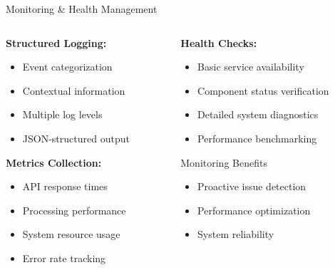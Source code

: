 \documentclass[aspectratio=169]{beamer}
\begin{document}
\begin{frame}{Monitoring \& Health Management}
    \begin{columns}[c]
        \begin{column}{0.5\textwidth}
            \textbf{Structured Logging:}
            \begin{itemize}
                \item Event categorization
                \item Contextual information
                \item Multiple log levels
                \item JSON-structured output
            \end{itemize}
            
            \vspace{0.3cm}
            
            \textbf{Metrics Collection:}
            \begin{itemize}
                \item API response times
                \item Processing performance
                \item System resource usage
                \item Error rate tracking
            \end{itemize}
        \end{column}
        \begin{column}{0.5\textwidth}
            \textbf{Health Checks:}
            \begin{itemize}
                \item Basic service availability
                \item Component status verification
                \item Detailed system diagnostics
                \item Performance benchmarking
            \end{itemize}
            
            \vspace{0.3cm}
            
            \begin{alertblock}{Monitoring Benefits}
                \begin{itemize}
                    \item Proactive issue detection
                    \item Performance optimization
                    \item System reliability
                \end{itemize}
            \end{alertblock}
        \end{column}
    \end{columns}
\end{frame}
\end{document}
